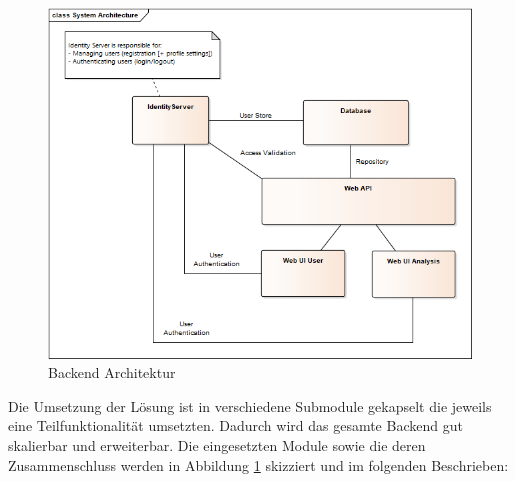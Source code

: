 \begin{figure}[h]
  \begin{center}
    \includegraphics[width=\textwidth]{./img/BackendDesign.png}
    \caption{Backend Architektur}
    \label{fig:backendDesign}
  \end{center}
\end{figure}

Die Umsetzung der Lösung ist in verschiedene Submodule gekapselt die jeweils eine Teilfunktionalität umsetzten. Dadurch wird das gesamte Backend gut skalierbar und erweiterbar. Die eingesetzten Module sowie die deren Zusammenschluss werden in Abbildung \ref{fig:backendDesign} skizziert und im folgenden Beschrieben:

